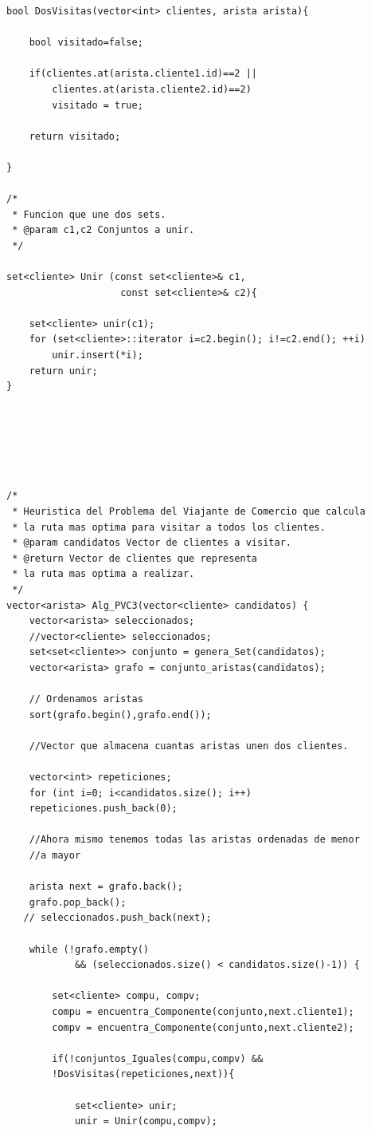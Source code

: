 \documentclass[a4paper,12pt,twoside]{article} %
\begin{document}
\begin{lstlisting}
bool DosVisitas(vector<int> clientes, arista arista){

    bool visitado=false;

    if(clientes.at(arista.cliente1.id)==2 ||
        clientes.at(arista.cliente2.id)==2) 
        visitado = true;

    return visitado;

}

/*
 * Funcion que une dos sets.
 * @param c1,c2 Conjuntos a unir.
 */

set<cliente> Unir (const set<cliente>& c1, 
                    const set<cliente>& c2){

    set<cliente> unir(c1);
    for (set<cliente>::iterator i=c2.begin(); i!=c2.end(); ++i)
        unir.insert(*i);
    return unir;
}






/*
 * Heuristica del Problema del Viajante de Comercio que calcula 
 * la ruta mas optima para visitar a todos los clientes.
 * @param candidatos Vector de clientes a visitar.
 * @return Vector de clientes que representa 
 * la ruta mas optima a realizar.
 */
vector<arista> Alg_PVC3(vector<cliente> candidatos) {
    vector<arista> seleccionados;
    //vector<cliente> seleccionados;
    set<set<cliente>> conjunto = genera_Set(candidatos);
    vector<arista> grafo = conjunto_aristas(candidatos);

    // Ordenamos aristas
    sort(grafo.begin(),grafo.end()); 

    //Vector que almacena cuantas aristas unen dos clientes.

    vector<int> repeticiones;
    for (int i=0; i<candidatos.size(); i++)
    repeticiones.push_back(0);

    //Ahora mismo tenemos todas las aristas ordenadas de menor
    //a mayor

    arista next = grafo.back();
    grafo.pop_back();
   // seleccionados.push_back(next);

    while (!grafo.empty() 
            && (seleccionados.size() < candidatos.size()-1)) {

        set<cliente> compu, compv;
        compu = encuentra_Componente(conjunto,next.cliente1);
        compv = encuentra_Componente(conjunto,next.cliente2);

        if(!conjuntos_Iguales(compu,compv) &&
        !DosVisitas(repeticiones,next)){

            set<cliente> unir;
            unir = Unir(compu,compv);


\end{lstlisting}
\end{document}
